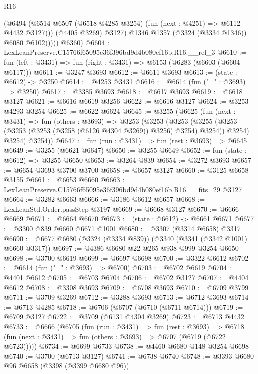 \begin{lexlean}{R16}
\begin{coremodule}
                  (@6494
                    (@6514 @6507 (@6518 @4285 @3254) (fun (next : @4251) => @6112 @4432 @3127)))
                  (@4405 @3269)
                  @3127)
                @1346
                @1357
                (@3324 (@3334 @1346))
                @6080
                @6102)))))
      @6360)
@6604 := LexLeanPreserve.C15766f65095e36f396bd9d4b080ef16b.R16.__rel_3
@6610 := fun (left : @3431) => fun (right : @3431) => @6153 (@6283 (@6603 (@6604 @6117)))
@6611 := @3247 @3693
@6612 := @6611 @3693
@6613 := (state : @6612) -> @3250
@6614 := @4253 @3431
@6616 := @6614 (fun ("_" : @3693) => @3250)
@6617 := @3385 @3693
@6618 := @6617 @3693
@6619 := @6618 @3127
@6621 := @6616 @6619 @3256
@6622 := @6616 @3127
@6624 := @3253 @4293 @3254
@6625 := @6622 @6624
@6645 := @3255
    (@6625
      (fun (next : @3431) =>
      fun (others : @3693) =>
      @3253
        (@3253
          (@3253
            (@3255 (@3253 (@3253 (@3253 (@3258 (@6126 @4304 @3269)) @3256) @3254) @3254))
            @3254)
          @3254)
        @3254))
@6647 := fun (run : @3431) => fun (rest : @3693) => @6645
@6649 := @3255 (@6621 @6647)
@6650 := @3255 @6649
@6652 := fun (state : @6612) => @3255 @6650
@6653 := @3264 @839
@6654 := @3272 @3693
@6657 := @6654 @3693 @3700 @3700
@6658 := @6657 @3127
@6660 := @3125 @6658 @3155
@6661 := @6653 @6660
@6663 := LexLeanPreserve.C15766f65095e36f396bd9d4b080ef16b.R16.__fits_29 @3127
@6664 := @3282 @6663
@6666 := @3186 @6612 @6657
@6668 := LexLeanStd.Order.passStep @3197
@6669 := @6668 @3127
@6670 := @6666 @6669
@6671 := @6664 @6670
@6673 := (state : @6612) -> @6661 @6671
@6677 := @3300 @839 @6660 @6671 @1001
@6680 := @3307 (@3314 @6658) @3317
@6690 := @6677 @6680 (@3324 (@3334 @839)) (@3340 (@3341 (@3342 @1001) @6660 @3317))
@6697 := @4386 @6680 @22 @265 @938 @999 @3254 @6650
@6698 := @3700 @6619
@6699 := @6697 @6698
@6700 := @3322 @6612
@6702 := @6614 (fun ("_" : @3693) => @6700)
@6703 := @6702 @6619
@6704 := @4401 @6612
@6705 := @6703 @6704
@6706 := @6702 @3127
@6707 := @4404 @6612
@6708 := @3308 @3693
@6709 := @6708 @3693
@6710 := @6709 @3799
@6711 := @3709 @3269
@6712 := @3288 @3693
@6713 := @6712 @3693
@6714 := @6713 @4285
@6718 := @6706 (@6707 (@6710 (@6711 @6714)))
@6719 := @6709 @3127
@6722 := @3709 (@6131 @4304 @3269)
@6723 := @6713 @4432
@6733 := @6666
    (@6705
      (fun (run : @3431) =>
      fun (rest : @3693) =>
      @6718 (fun (next : @3431) => fun (others : @3693) => @6707 (@6719 (@6722 @6723)))))
@6734 := @6699 @6733
@6738 := @4460 @6680 @148 @3254 @6698
@6740 := @3700 (@6713 @3127)
@6741 := @6738 @6740
@6748 := @3393 @6680 @96 @6658 (@3398 (@3399 @6680 @96))

\end{coremodule}
\end{lexlean}
